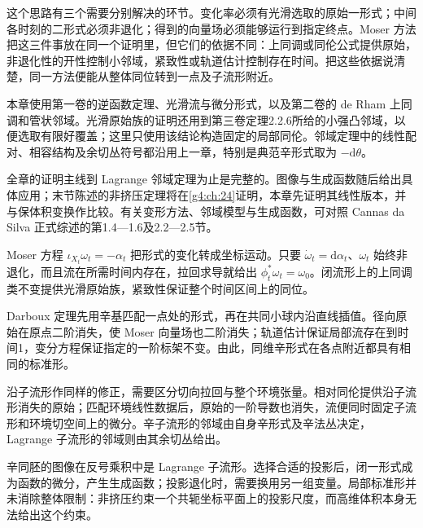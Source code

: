 这个思路有三个需要分别解决的环节。变化率必须有光滑选取的原始一形式；中间各时刻的二形式必须非退化；得到的向量场必须能够运行到指定终点。Moser 方法把这三件事放在同一个证明里，但它们的依据不同：上同调或同伦公式提供原始，非退化性的开性控制小邻域，紧致性或轨道估计控制存在时间。把这些依据说清楚，同一方法便能从整体同位转到一点及子流形附近。

\ProseParagraphBreak

本章使用第一卷的逆函数定理、光滑流与微分形式，以及第二卷的 de Rham 上同调和管状邻域。光滑原始族的证明还用到第三卷定理2.2.6所给的小强凸邻域，以便选取有限好覆盖；这里只使用该结论构造固定的局部同伦。邻域定理中的线性配对、相容结构及余切丛符号都沿用上一章，特别是典范辛形式取为 \(-\mathrm{d}\theta\)。

\ProseParagraphBreak

全章的证明主线到 Lagrange 邻域定理为止是完整的。图像与生成函数随后给出具体应用；末节陈述的非挤压定理将在\cref{g4:ch:24}证明，本章先证明其线性版本，并与保体积变换作比较。有关变形方法、邻域模型与生成函数，可对照 Cannas da Silva 正式综述的第1.4—1.6及2.2—2.5节。\cite[第1.4--1.6、2.2--2.5节]{Cannas2006Symplectic}







\begin{chaptersummary}
Moser 方程 \(\iota_{X_t}\omega_t=-\alpha_t\) 把形式的变化转成坐标运动。只要 \(\dot\omega_t=\mathrm{d}\alpha_t\)、\(\omega_t\) 始终非退化，而且流在所需时间内存在，拉回求导就给出 \(\phi_t^*\omega_t=\omega_0\)。闭流形上的上同调类不变提供光滑原始族，紧致性保证整个时间区间上的同位。

\ProseParagraphBreak

Darboux 定理先用辛基匹配一点处的形式，再在共同小球内沿直线插值。径向原始在原点二阶消失，使 Moser 向量场也二阶消失；轨道估计保证局部流存在到时间1，变分方程保证指定的一阶标架不变。由此，同维辛形式在各点附近都具有相同的标准形。

\ProseParagraphBreak

沿子流形作同样的修正，需要区分切向拉回与整个环境张量。相对同伦提供沿子流形消失的原始；匹配环境线性数据后，原始的一阶导数也消失，流便同时固定子流形和环境切空间上的微分。辛子流形的邻域由自身辛形式及辛法丛决定，Lagrange 子流形的邻域则由其余切丛给出。

\ProseParagraphBreak

辛同胚的图像在反号乘积中是 Lagrange 子流形。选择合适的投影后，闭一形式成为函数的微分，产生生成函数；投影退化时，需要换用另一组变量。局部标准形并未消除整体限制：非挤压约束一个共轭坐标平面上的投影尺度，而高维体积本身无法给出这个约束。
\end{chaptersummary}


